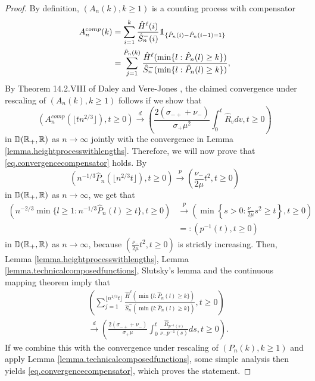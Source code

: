 \begin{proof}
By definition, $(A_n(k),k\geq 1)$ is a counting process with compensator 
\begin{align*}
    A_n^{comp}(k)&=\sum_{i=1}^k \frac{\hat{H}^\ell(i)}{\hat{S}^-_n(i)}\one_{\{\hat{P}_n(i)-\hat{P}_n(i-1)=1\}}\\
    &=\sum_{j=1}^{\hat{P}_n(k)}\frac{\hat{H}^\ell(\min\{l:\hat{P}_n(l)\geq k\})}{\hat{S}^-_n(\min\{l:\hat{P}_n(l)\geq k\})},
\end{align*}
 By Theorem 14.2.VIII of Daley and Vere-Jones \cite{daleyIntroductionTheoryPoint2008}, the claimed convergence under rescaling of $(A_n(k),k\geq 1)$ follows if we show that 
\begin{equation}\label{eq.convergencecompensator}
    \left(A_n^{comp}\left(\lfloor tn^{2/3}\rfloor \right), t\geq 0\right)\overset{d}{\to}\left(\frac{2(\sigma_{-+}+\nu_-)}{\sigma_+\mu^2} \int_0^t\hat{R}_v dv, t \geq 0\right)
\end{equation}
in ${\mathbb D}({\mathbb R}_+,{\mathbb R})$ as $n\to \infty$ jointly with the convergence in Lemma \ref{lemma.heightprocesswithlengths}. Therefore, we will now prove that \eqref{eq.convergencecompensator} holds. 
By
$$\left(n^{-1/3}\hat{P}_n\left(\lfloor n^{2/3}t\rfloor \right),t\geq 0\right)\overset{p}{\to}\left(\frac{\nu_-}{2\mu}t^2,t\geq 0\right)$$
in ${\mathbb D}({\mathbb R}_+,{\mathbb R})$ as $n\to \infty$,
we get that
\begin{align*}\left(n^{-2/3}\min\{l\geq 1:n^{-1/3}\hat{P}_n(l)\geq t\},t\geq 0\right)&\overset{p}{\to}\left(\min\left\{s>0: \frac{\nu_-}{2\mu}s^2\geq t\right \}, t\geq 0\right)\\
&=:\left(p^{-1}(t),t\geq 0\right) \end{align*}
in ${\mathbb D}({\mathbb R}_+,{\mathbb R})$ as $n\to \infty$, because $\left(\frac{\nu_-}{2\mu}t^2,t\geq 0\right)$ is strictly increasing. Then, Lemma \ref{lemma.heightprocesswithlengths}, Lemma \ref{lemma.technicalcomposedfunctions}, Slutsky's lemma and the continuous mapping theorem imply that 
\begin{align*}&\left(\sum_{j=1}^{\lfloor n^{1/3}t\rfloor}\frac{\hat{H}^\ell(\min\{l:\hat{P}_n(l)\geq k\})}{\hat{S}^-_n(\min\{l:\hat{P}_n(l)\geq k\})},t\geq 0\right)\\
&\overset{d}{\to} \left( \frac{2(\sigma_{-+}+\nu_-)}{\sigma_+\mu} \int_0^t \frac{\hat{R}_{p^{-1}(s)}}{\nu_- p^{-1}(s)}ds,t\geq 0 \right).
\end{align*}
If we combine this with the convergence under rescaling of $(P_n(k),k\geq 1)$ and apply Lemma \ref{lemma.technicalcomposedfunctions}, some simple analysis then yields \eqref{eq.convergencecompensator}, which proves the statement.
\end{proof}

